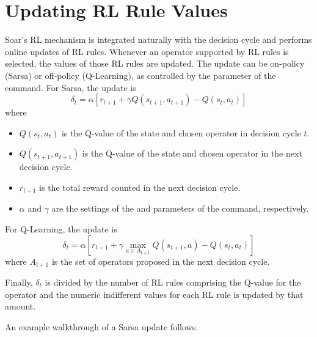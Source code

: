 \section{Updating RL Rule Values}
\label{RL-algo}

Soar's RL mechanism is integrated naturally with the decision cycle and performs online updates of RL rules.
Whenever an operator supported by RL rules is selected, the values of those RL rules are updated.
The update can be on-policy (Sarsa) or off-policy (Q-Learning), as controlled by the  parameter of the  command.
For Sarsa, the update is
$$ \delta_t = \alpha \left[ r_{t+1} + \gamma Q(s_{t+1}, a_{t+1}) - Q(s_t, a_t) \right] $$
where 
\begin{itemize}
\item $Q(s_t, a_t)$ is the Q-value of the state and chosen operator in decision cycle $t$.
\item $Q(s_{t+1}, a_{t+1})$ is the Q-value of the state and chosen operator in the next decision cycle.
\item $r_{t+1}$ is the total reward counted in the next decision cycle.
\item $\alpha$ and $\gamma$ are the settings of the  and  parameters of the  command, respectively.
\end{itemize}

For Q-Learning, the update is
$$ \delta_t = \alpha \left[ r_{t+1} + \gamma \underset{a \in A_{t+1}}{\max} Q(s_{t+1}, a) - Q(s_t, a_t) \right] $$
where $A_{t+1}$ is the set of operators proposed in the next decision cycle.

Finally, $\delta_t$ is divided by the number of RL rules comprising the Q-value for the operator and the numeric indifferent values for each RL rule is updated by that amount.

An example walkthrough of a Sarsa update follows.


